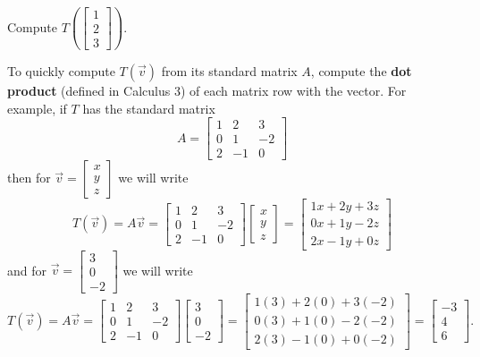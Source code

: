 \begin{applicationActivities}
\begin{activity}{5}
Compute $T\left(\begin{bmatrix} 1\\ 2 \\ 3 \end{bmatrix} \right) $.
\end{activity}

\begin{fact}
  To quickly compute \(T(\vec v)\) from its standard matrix \(A\),
  compute the \textbf{dot product} (defined in Calculus 3) of each matrix row
  with the vector. For example, if \(T\) has the standard matrix
  \[
    A = \begin{bmatrix} 1 & 2 & 3 \\ 0 & 1 & -2 \\ 2 & -1 & 0 \end{bmatrix}
  \]
  then for \(\vec v=\begin{bmatrix}x\\y\\z\end{bmatrix}\) we will write
  \[
    T(\vec v)
      =
    A\vec v
      =
    \begin{bmatrix} 1 & 2 & 3 \\ 0 & 1 & -2 \\ 2 & -1 & 0 \end{bmatrix}
    \begin{bmatrix}x\\y\\z\end{bmatrix}
      =
    \begin{bmatrix}
      1x+2y+3z\\
      0x+1y-2z\\
      2x-1y+0z
    \end{bmatrix}
  \]
  and for \(\vec v=\begin{bmatrix}3\\0\\-2\end{bmatrix}\) we will write
  \[
    T(\vec v)
      =
    A\vec v
      =
    \begin{bmatrix} 1 & 2 & 3 \\ 0 & 1 & -2 \\ 2 & -1 & 0 \end{bmatrix}
    \begin{bmatrix}3\\0\\-2\end{bmatrix}
      =
    \begin{bmatrix}
      1(3)+2(0)+3(-2)\\
      0(3)+1(0)-2(-2)\\
      2(3)-1(0)+0(-2)
    \end{bmatrix}
      =
    \begin{bmatrix}
      -3\\
      4\\
      6
    \end{bmatrix}
  .\]
\end{fact}

\end{applicationActivities}
